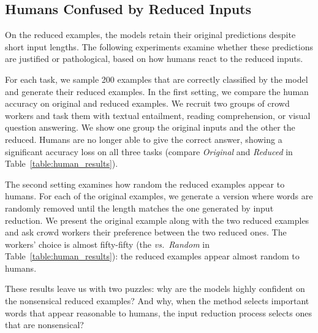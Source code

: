 \subsection{Humans Confused by Reduced Inputs}
\label{sec:human}

On the reduced examples, the models retain their original predictions
despite short input lengths. The following experiments examine whether
these predictions are justified or pathological, based on how humans react to
the reduced inputs.

For each task, we sample 200 examples that are correctly classified by
the model and generate their reduced examples. In the first setting, we
compare the human accuracy on original and reduced examples.
We recruit two groups of crowd workers and task them with textual entailment,
reading comprehension, or visual question answering. We show one group the
original inputs and the other the reduced.  Humans are no longer able to give
the correct answer, showing a significant accuracy loss on all three tasks
(compare \emph{Original} and \emph{Reduced} in Table~\ref{table:human_results}).

The second setting examines how random the reduced examples appear to
humans. For each of the original examples, we generate a version where words are
randomly removed until the
length matches the one generated by input reduction. We present the original example
along with the two reduced examples and ask crowd workers their preference between the two
reduced ones. The workers' choice is almost fifty-fifty (the \emph{vs.\ Random}
in Table~\ref{table:human_results}): the reduced examples appear almost
random to humans.

These results leave us with two puzzles: why are the models highly confident on the
nonsensical reduced examples? And why, when the \loo{} method selects important
words that appear reasonable to humans, the input reduction process selects ones
that are nonsensical?
